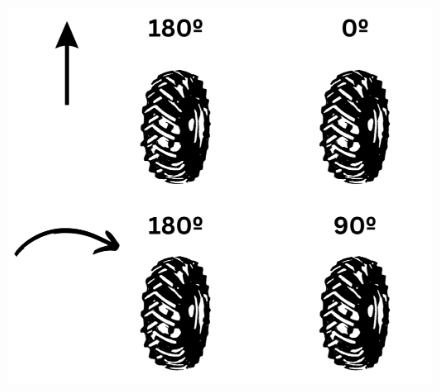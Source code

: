

\begin{figure}[ht!]
	\centering
	\begin{minipage}{0.3\linewidth}
		\centering
		\includegraphics[width=\linewidth]{figs/cap6/motorlogic1.png}
	\end{minipage}
	\hspace{1cm}
	\begin{minipage}{0.3\linewidth}
		\centering

\end{minipage}
\end{figure}

